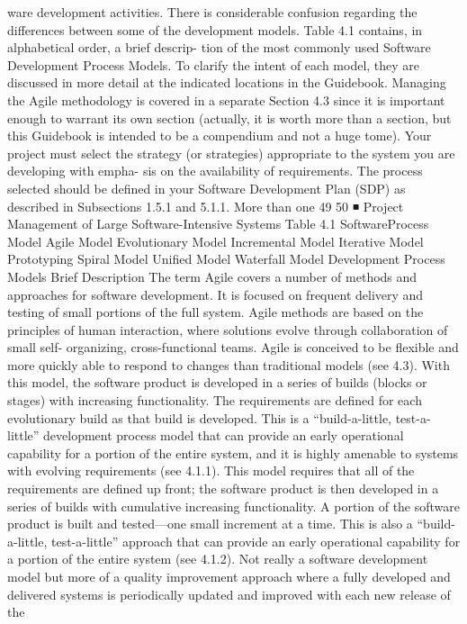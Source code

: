 \documentclass[a4paper,12pt]{book}
\begin{document}
ware development activities. There is considerable confusion
regarding the differences between some of the development
models. Table 4.1 contains, in alphabetical order, a brief descrip-
tion of the most commonly used Software Development Process
Models. To clarify the intent of each model, they are discussed in
more detail at the indicated locations in the Guidebook.
Managing the Agile methodology is covered in a separate
Section 4.3 since it is important enough to warrant its own
section (actually, it is worth more than a section, but this
Guidebook is intended to be a compendium and not a huge
tome). Your project must select the strategy (or strategies)
appropriate to the system you are developing with empha-
sis on the availability of requirements. The process selected
should be defined in your Software Development Plan (SDP)
as described in Subsections 1.5.1 and 5.1.1. More than one
49
50 ◾
Project Management of Large Software-Intensive Systems
Table 4.1
SoftwareProcess Model
Agile Model
Evolutionary
Model
Incremental
Model
Iterative Model
Prototyping
Spiral Model
Unified Model
Waterfall
Model
Development Process Models
Brief Description
The term Agile covers a number of methods and approaches for software development. It is focused
on frequent delivery and testing of small portions of the full system. Agile methods are based on the
principles of human interaction, where solutions evolve through collaboration of small self-
organizing, cross-functional teams. Agile is conceived to be flexible and more quickly able to
respond to changes than traditional models (see 4.3).
With this model, the software product is developed in a series of builds (blocks or stages) with
increasing functionality. The requirements are defined for each evolutionary build as that build is
developed. This is a “build-a-little, test-a-little” development process model that can provide an early
operational capability for a portion of the entire system, and it is highly amenable to systems with
evolving requirements (see 4.1.1).
This model requires that all of the requirements are defined up front; the software product is then
developed in a series of builds with cumulative increasing functionality. A portion of the software
product is built and tested—one small increment at a time. This is also a “build-a-little, test-a-little”
approach that can provide an early operational capability for a portion of the entire system (see
4.1.2).
Not really a software development model but more of a quality improvement approach where a fully
developed and delivered systems is periodically updated and improved with each new release of the
\end{document}
